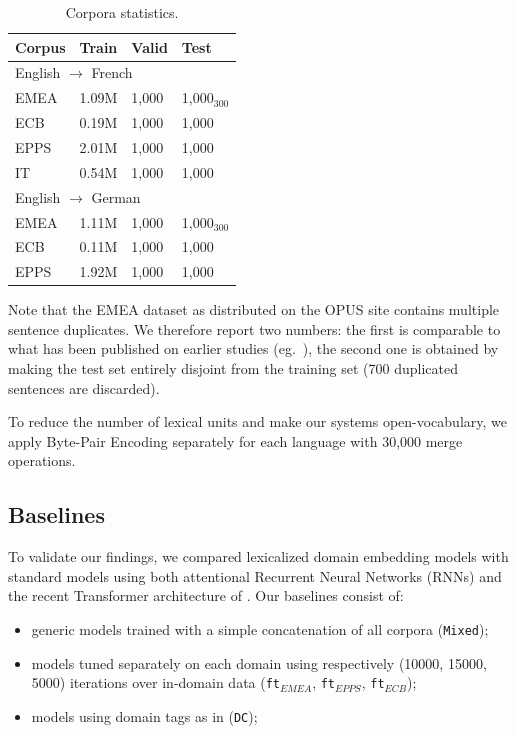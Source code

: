 \documentclass[a4paper]{article}
\newcommand{\fyDone}[1]{\done[FY]\Todo[FY:]{\textcolor{orange}{#1}}}
\begin{document}
\fyDone{Check which corpus are useful}
\begin{table}[h]
  \centering
  \begin{tabular}{ |llll|} %
    \hline
    Corpus & Train & Valid & Test \\ 
    \hline
    \multicolumn{4}{l}{English $\rightarrow$ French }\\
    \hline
    EMEA  & 1.09M & 1,000 & 1,000$_{300}$\\
    ECB    & 0.19M & 1,000 & 1,000     \\
    EPPS   & 2.01M  & 1,000 & 1,000  \\
    IT         & 0.54M  & 1,000 & 1,000 \\  
    \hline
    \multicolumn{4}{l}{English $\rightarrow$ German}\\
    \hline
    EMEA  & 1.11M & 1,000 & 1,000$_{300}$ \\
    ECB     &  0.11M & 1,000 & 1,000  \\
    EPPS   & 1.92M & 1,000 & 1,000 \\ 
    \hline
\end{tabular}
\caption{Corpora statistics.}
\label{tab:Corpora}
\end{table}

Note that the EMEA dataset as distributed on the OPUS site contains multiple sentence duplicates. 
We therefore report two numbers: the first is comparable to what has been published on earlier studies (eg.\ \cite{Zeng18multidomain}), the second one is obtained by making the test set entirely disjoint from the training set (700 duplicated sentences are discarded).

To reduce the number of lexical units and make our systems open-vocabulary, we apply Byte-Pair Encoding \cite{Sennrich16BPE} separately for each language with 30,000 merge operations. \fyDone{I need explanations here}

\subsection{Baselines \label{ssec:baselines}}
To validate our findings, we compared lexicalized domain embedding models with standard models using both attentional Recurrent Neural Networks (RNNs) \cite{Bahdanau15learning} and the recent Transformer architecture of \cite{Vaswani17attention}. Our baselines consist of:
\begin{itemize}
\item generic models trained with a simple concatenation of all corpora (\texttt{Mixed}); 
\item models tuned separately on each domain using respectively (10000, 15000, 5000) iterations over in-domain data (\texttt{ft$_{EMEA}$}, \texttt{ft$_{EPPS}$}, \texttt{ft$_{ECB}$}); 
\item models using domain tags as in \cite{Kobus17domaincontrol} (\texttt{DC}); 
\end{itemize}
\end{document}
